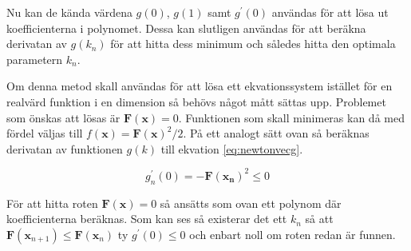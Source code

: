 \noindent
Nu kan de kända värdena $g(0)$, $g(1)$ samt $g^\prime(0)$ användas för att lösa ut koefficienterna i polynomet.
Dessa kan slutligen användas för att beräkna derivatan av $g(k_n)$ för att hitta dess minimum och således
hitta den optimala parametern $k_n$.

\noindent
Om denna metod skall användas för att lösa ett ekvationssystem istället för en realvärd funktion i en dimension
så behövs något mått sättas upp. Problemet som önskas att lösas är $\mathbf{F}(\mathbf{x}) = 0$.
Funktionen som skall minimeras kan då med fördel väljas till $f(\mathbf{x}) = \mathbf{F}(\mathbf{x})^2/2$.
På ett analogt sätt ovan så beräknas derivatan av funktionen $g(k)$ till ekvation \eqref{eq:newtonvecg}.\cite{fortran77}

\begin{equation}
\label{eq:newtonvecg}
g_n^\prime(0) = - \mathbf{F}(\mathbf{x_n})^2 \le 0
\end{equation}

\noindent
För att hitta roten $\mathbf{F}(\mathbf{x}) = 0$ så ansätts som ovan ett polynom där koefficienterna beräknas.
Som kan ses så existerar det ett $k_n$ så att $\mathbf{F}(\mathbf{x}_{n+1}) \le \mathbf{F}(\mathbf{x}_n)$ ty
$g^\prime(0) \le 0$ och enbart noll om roten redan är funnen.

